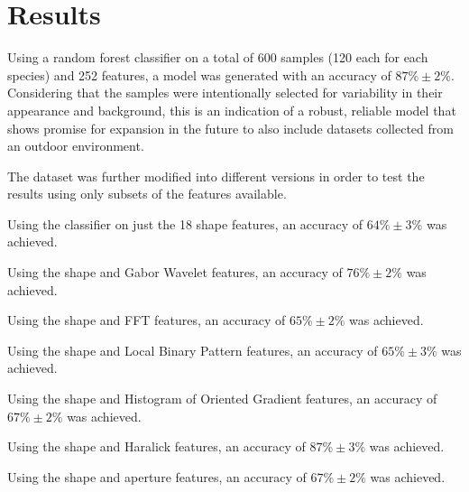 \section{Results}

Using a random forest classifier on a total of 600 samples (120 each for each species) and 252 features, a model was generated with an accuracy of $87\% \pm 2\%$. Considering that the samples were intentionally selected for variability in their appearance and background, this is an indication of a robust, reliable model that shows promise for expansion in the future to also include datasets collected from an outdoor environment. 

The dataset was further modified into different versions in order to test the results using only subsets of the features available.

Using the classifier on just the 18 shape features, an accuracy of  $64\% \pm 3\%$ was achieved.

Using the shape and Gabor Wavelet features, an accuracy of $76\% \pm 2\%$ was achieved.

Using the shape and FFT features, an accuracy of $65\% \pm 2\%$ was achieved.

Using the shape and Local Binary Pattern features, an accuracy of $65\% \pm 3\%$ was achieved.

Using the shape and Histogram of Oriented Gradient features, an accuracy of $67\% \pm 2\%$ was achieved.

Using the shape and Haralick features, an accuracy of $87\% \pm 3\%$ was achieved.

Using the shape and aperture features, an accuracy of $67\% \pm 2\%$ was achieved.

  
  
  
  
  